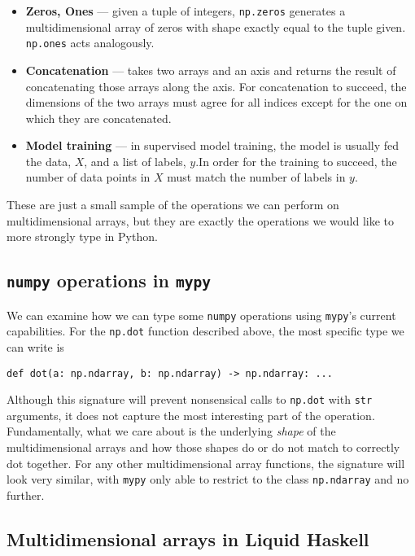 \documentclass{report}
\begin{document}
\begin{itemize}
    \item \textbf{Zeros, Ones} --- given a tuple of integers, \texttt{np.zeros} generates a multidimensional array of zeros with shape exactly equal to the tuple given. \texttt{np.ones} acts analogously.

    \item \textbf{Concatenation} --- takes two arrays and an axis and returns the result of concatenating those arrays along the axis. For concatenation to succeed, the dimensions of the two arrays must agree for all indices except for the one on which they are concatenated.

    \item \textbf{Model training} \cite{sklearn} --- in supervised model training, the model is usually fed the data, $X$, and a list of labels, $y$.In order for the training to succeed, the number of data points in $X$ must match the number of labels in $y$.
\end{itemize}
These are just a small sample of the operations we can perform on multidimensional arrays, but they are exactly the operations we would like to more strongly type in Python.

\subsection{\texttt{numpy} operations in \texttt{mypy}}

We can examine how we can type some \texttt{numpy} operations using \texttt{mypy}'s current capabilities. For the \texttt{np.dot} function described above, the most specific type we can write is
\begin{center}
    \texttt{def dot(a: np.ndarray, b: np.ndarray) -> np.ndarray: ...}
\end{center}
Although this signature will prevent nonsensical calls to \texttt{np.dot} with \texttt{str} arguments, it does not capture the most interesting part of the operation. Fundamentally, what we care about is the underlying \textit{shape} of the multidimensional arrays and how those shapes do or do not match to correctly dot together. For any other multidimensional array functions, the signature will look very similar, with \texttt{mypy} only able to restrict to the class \texttt{np.ndarray} and no further.

\subsection{Multidimensional arrays in Liquid Haskell}
\end{document}
